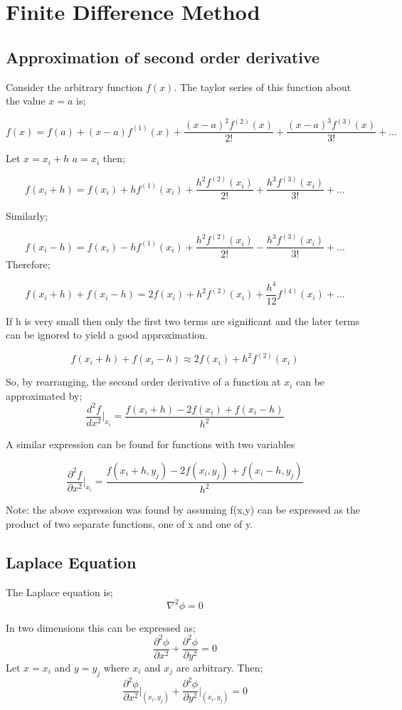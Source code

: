 \documentclass[a4paper, 11pt]{article}
\begin{document}
\section{Finite Difference Method}

\subsection{Approximation of second order derivative}
Consider the arbitrary function \(f(x)\). The taylor series of this function about the value \(x=a\) is;

\[f(x) = f(a) +(x-a)f^{(1)}(x)+\frac{(x-a)^{2}f^{(2)}(x)}{2!}+\frac{(x-a)^{3}f^{(3)}(x)}{3!}+...\]

Let \(x=x_i + h\) \(a=x_i\) then;

\[f(x_i+h)=f(x_i)+hf^{(1)}(x_i)+\frac{h^2f^{(2)}(x_i)}{2!}+\frac{h^3f^{(3)}(x_i)}{3!}+...\]

Similarly;

\[f(x_i-h)=f(x_i)-hf^{(1)}(x_i)+\frac{h^2f^{(2)}(x_i)}{2!}-\frac{h^3f^{(3)}(x_i)}{3!}+...\]
Therefore;

\[f(x_i+h)+f(x_i-h) = 2f(x_i) + h^2f^{(2)}(x_i) + \frac{h^4}{12}f^{(4)}(x_i)+...\]

If h is very small then only the first two terms are significant and the later terms can be ignored to yield a good approximation.

\[f(x_i+h)+f(x_i-h) \approx 2f(x_i) + h^2f^{(2)}(x_i)\]

So, by rearranging, the second order derivative of a function at \(x_i\) can be approximated by;
\[\frac{d^2f}{dx^2}\Bigg|_{x_i} = \frac{f(x_i+h)-2f(x_i)+f(x_i-h)}{h^2}\]

A similar expression can be found for functions with two variables

\[\frac{\partial^2f}{\partial x^2}\Bigg|_{x_i} = \frac{f(x_i+h,y_j)-2f(x_i,y_j)+f(x_i-h,y_j)}{h^2}\]

Note: the above expression was found by assuming f(x,y) can be expressed as the product of two separate functions, one of x and one of y. \\


\subsection{Laplace Equation}

The Laplace equation is;
\[\nabla^2\phi = 0\]

In two dimensions this can be expressed as;
\[\frac{\partial^2\phi}{\partial x^2} + \frac{\partial^2\phi}{\partial y^2} = 0\]
Let \(x=x_i\) and \(y=y_j\) where \(x_i\) and \(x_j\) are arbitrary. Then;
\[\frac{\partial^2\phi}{\partial x^2}\Bigg|_{(x_{i},y_{j})} + \frac{\partial^2\phi}{\partial y^2}\Bigg|_{(x_{i},y_{j})} = 0\]
\end{document}
